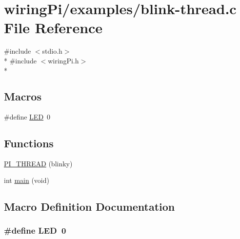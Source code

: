 \hypertarget{blink-thread_8c}{\section{wiring\-Pi/examples/blink-\/thread.c File Reference}
\label{blink-thread_8c}
}
{\ttfamily \#include $<$stdio.\-h$>$}\\*
{\ttfamily \#include $<$wiring\-Pi.\-h$>$}\\*
\subsection*{Macros}
\begin{DoxyCompactItemize}
\item 
\#define \hyperlink{blink-thread_8c_aeb7a7ba1ab7e0406f1b5ab36d579f585}{L\-E\-D}~0
\end{DoxyCompactItemize}
\subsection*{Functions}
\begin{DoxyCompactItemize}
\item 
\hyperlink{blink-thread_8c_ae9c105b41d68d1f06abd037cdb4cff16}{P\-I\-\_\-\-T\-H\-R\-E\-A\-D} (blinky)
\item 
int \hyperlink{blink-thread_8c_a840291bc02cba5474a4cb46a9b9566fe}{main} (void)
\end{DoxyCompactItemize}


\subsection{Macro Definition Documentation}
\hypertarget{blink-thread_8c_aeb7a7ba1ab7e0406f1b5ab36d579f585}{
\subsubsection[{L\-E\-D}]{\setlength{\rightskip}{0pt plus 5cm}\#define L\-E\-D~0}}\label{blink-thread_8c_aeb7a7ba1ab7e0406f1b5ab36d579f585}


